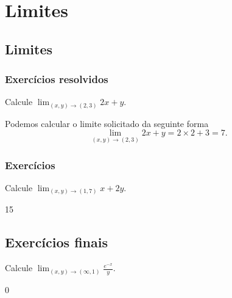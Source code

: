 
\chapter{Limites}\label{cap:limites}

\emconstrucao

\section{Limites}

\construirSec

\subsection*{Exercícios resolvidos}

\construirExeresol

\begin{exeresol}
  Calcule $\lim_{(x, y)\to (2, 3)} 2x + y$.
\end{exeresol}
\begin{resol}
  Podemos calcular o limite solicitado da seguinte forma
  \begin{equation}
      \lim_{(x, y)\to (2, 3)} 2x + y = 2\times 2 + 3 = 7.
  \end{equation}
\end{resol}

\subsection*{Exercícios}

\construirExer

\begin{exer}
  Calcule $\lim_{(x, y)\to (1, 7)} x + 2y$.
\end{exer}
\begin{resp}
  15
\end{resp}

\section{Exercícios finais}

\construirExer

\begin{exer}
  Calcule $\displaystyle\lim_{(x, y)\to (\infty, 1)} \frac{e^{-x}}{y}$.
\end{exer}
\begin{resp}
  0
\end{resp}


